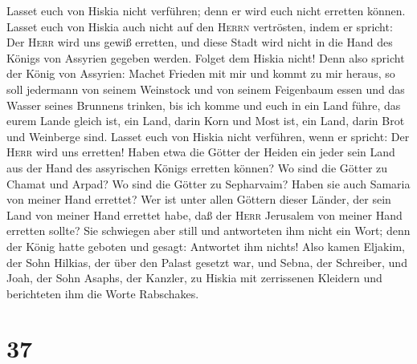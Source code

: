 Lasset euch von Hiskia nicht verführen; denn er wird euch nicht erretten
können.  Lasset euch von Hiskia auch nicht auf den
\textsc{Herrn} vertrösten, indem er spricht: Der \textsc{Herr} wird uns
gewiß erretten, und diese Stadt wird nicht in die Hand des Königs von
Assyrien gegeben werden.  Folget dem Hiskia nicht! Denn
also spricht der König von Assyrien: Machet Frieden mit mir und kommt zu
mir heraus, so soll jedermann von seinem Weinstock und von seinem
Feigenbaum essen und das Wasser seines Brunnens trinken, 
bis ich komme und euch in ein Land führe, das eurem Lande gleich ist,
ein Land, darin Korn und Most ist, ein Land, darin Brot und Weinberge
sind.  Lasset euch von Hiskia nicht verführen, wenn er
spricht: Der \textsc{Herr} wird uns erretten! Haben etwa die Götter der
Heiden ein jeder sein Land aus der Hand des assyrischen Königs erretten
können?  Wo sind die Götter zu Chamat und Arpad? Wo sind
die Götter zu Sepharvaim? Haben sie auch Samaria von meiner Hand
errettet?  Wer ist unter allen Göttern dieser Länder, der
sein Land von meiner Hand errettet habe, daß der \textsc{Herr} Jerusalem
von meiner Hand erretten sollte?  Sie schwiegen aber
still und antworteten ihm nicht ein Wort; denn der König hatte geboten
und gesagt: Antwortet ihm nichts!  Also kamen Eljakim,
der Sohn Hilkias, der über den Palast gesetzt war, und Sebna, der
Schreiber, und Joah, der Sohn Asaphs, der Kanzler, zu Hiskia mit
zerrissenen Kleidern und berichteten ihm die Worte Rabschakes.

\hypertarget{section-36}{%
\section{37}\label{section-36}}


